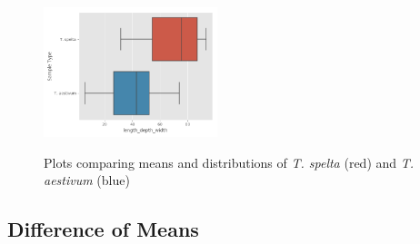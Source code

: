 \documentclass[11pt]{report}
\begin{document}
\begin{figure}[!ht]
{    \includegraphics[width=0.45\textwidth]{./images/results/group3/length_depth_width.png}
    }
  \caption{Plots comparing means and distributions of \textit{T. spelta} (red) and \textit{T. aestivum} (blue)}
  \label{fig:dummy}
\end{figure}
\clearpage
\subsection{Difference of Means}
\label{sec:org6fd810c}
\end{document}
